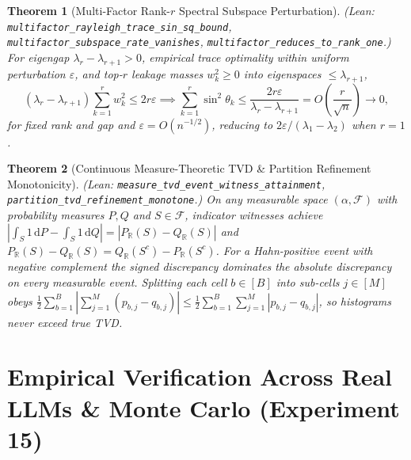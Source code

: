 \documentclass[11pt]{article}
\newtheorem{theorem}{Theorem}
\newcommand{\R}{\mathbb{R}}
\begin{document}
\begin{theorem}[Multi-Factor Rank-$r$ Spectral Subspace Perturbation]
\emph{(Lean: \texttt{multifactor\_\allowbreak rayleigh\_\allowbreak trace\_sin\_sq\_bound}, \texttt{multifactor\_\allowbreak subspace\_\allowbreak rate\_vanishes}, \texttt{multifactor\_\allowbreak reduces\_\allowbreak to\_rank\_one}.)}
For eigengap $\lambda_r - \lambda_{r+1} > 0$, empirical trace optimality within uniform perturbation $\varepsilon$, and top-$r$ leakage masses $w_k^2 \ge 0$ into eigenspaces $\le \lambda_{r+1}$,
\[
(\lambda_r - \lambda_{r+1})\sum_{k=1}^r w_k^2 \le 2 r \varepsilon \implies \sum_{k=1}^r \sin^2\theta_k \le \frac{2 r \varepsilon}{\lambda_r - \lambda_{r+1}} = O\!\left(\frac{r}{\sqrt{n}}\right) \to 0,
\]
for fixed rank and gap and $\varepsilon=O(n^{-1/2})$, reducing to $2\varepsilon/(\lambda_1 - \lambda_2)$ when $r=1$.
\end{theorem}

\begin{theorem}[Continuous Measure-Theoretic TVD \& Partition Refinement Monotonicity]
\emph{(Lean: \texttt{measure\_\allowbreak tvd\_\allowbreak event\_\allowbreak witness\_\allowbreak attainment}, \texttt{partition\_\allowbreak tvd\_\allowbreak refinement\_\allowbreak monotone}.)}
On any measurable space $(\alpha, \mathcal{F})$ with probability measures $P, Q$ and $S \in \mathcal{F}$, indicator witnesses achieve $|\int_S 1\,\mathrm{d}P - \int_S 1\,\mathrm{d}Q| = |P_{\R}(S) - Q_{\R}(S)|$ and $P_{\R}(S)-Q_{\R}(S) = Q_{\R}(S^c) - P_{\R}(S^c)$. For a Hahn-positive event with negative complement the signed discrepancy dominates the absolute discrepancy on every measurable event. Splitting each cell $b \in [B]$ into sub-cells $j \in [M]$ obeys $\frac{1}{2}\sum_{b=1}^B |\sum_{j=1}^M (p_{b,j}-q_{b,j})| \le \frac{1}{2}\sum_{b=1}^B \sum_{j=1}^M |p_{b,j}-q_{b,j}|$, so histograms never exceed true TVD.
\end{theorem}

\clearpage
\section{Empirical Verification Across Real LLMs \& Monte Carlo (Experiment 15)}
\end{document}
